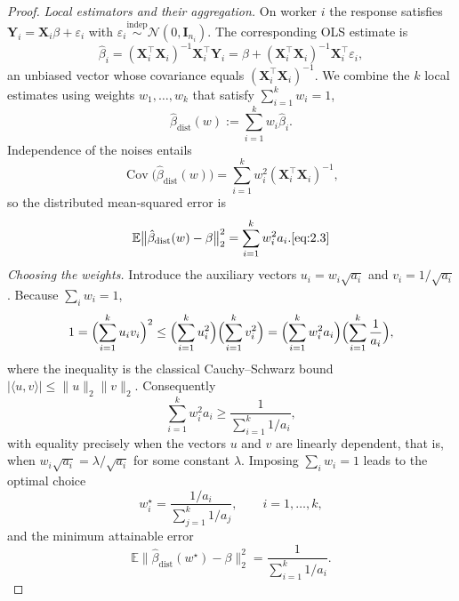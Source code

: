 \documentclass[11pt]{article}
\numberwithin{equation}{section}
\theoremstyle{plain}
\theoremstyle{definition}
\theoremstyle{remark}
\begin{document}
\begin{appendix}
\begin{proof}
      \medskip
      \textit{Local estimators and their aggregation.}
      On worker $i$ the response satisfies
      $\mathbf{Y}_i=\mathbf{X}_i\beta+\varepsilon_i$ with
      $\varepsilon_i\stackrel{\text{indep}}{\sim}\mathcal N(0,\mathbf{I}_{n_i})$.
      The corresponding OLS estimate is
      \[
        \hat\beta_i
         =(\mathbf{X}_i^{\top}\mathbf{X}_i)^{-1}\mathbf{X}_i^{\top}\mathbf{Y}_i
         =\beta+(\mathbf{X}_i^{\top}\mathbf{X}_i)^{-1}\mathbf{X}_i^{\top}\varepsilon_i ,
      \]
      an unbiased vector whose covariance equals $(\mathbf{X}_i^{\top}\mathbf{X}_i)^{-1}$.
      We combine the $k$ local estimates using weights
      $w_1,\dots,w_k$ that satisfy $\sum_{i=1}^{k}w_i=1$,
      \[
        \hat\beta_{\mathrm{dist}}(w)
          :=\sum_{i=1}^{k}w_i\hat\beta_i .
      \]
      Independence of the noises entails
      \[
        \operatorname{Cov}\!\bigl(\hat\beta_{\mathrm{dist}}(w)\bigr)
          =\sum_{i=1}^{k}w_i^{2}(\mathbf{X}_i^{\top}\mathbf{X}_i)^{-1},
      \]
      so the distributed mean-squared error is
      \[
        \mathbb E\bigl\|\hat\beta_{\mathrm{dist}}(w)-\beta\bigr\|_{2}^{2}
          =\sum_{i=1}^{k}w_i^{2}a_i .\ref{eq:2.3}
      \]
      \medskip
      \textit{Choosing the weights.}
      Introduce the auxiliary vectors
      $u_i=w_i\sqrt{a_i}$ and $v_i=1/\sqrt{a_i}$.
      Because $\sum_i w_i=1$,
      \[
        1=\Bigl(\sum_{i=1}^{k}u_iv_i\Bigr)^{2}
          \le
          \Bigl(\sum_{i=1}^{k}u_i^{2}\Bigr)
          \Bigl(\sum_{i=1}^{k}v_i^{2}\Bigr)
          =\Bigl(\sum_{i=1}^{k}w_i^{2}a_i\Bigr)
           \Bigl(\sum_{i=1}^{k}\frac1{a_i}\Bigr),
      \]
      where the inequality is the classical Cauchy–Schwarz bound
      $|\langle u,v\rangle|\le\|u\|_2\|v\|_2$.
      Consequently
      \[
        \sum_{i=1}^{k}w_i^{2}a_i
         \ge\frac{1}{\sum_{i=1}^{k}1/a_i},
      \]
      with equality precisely when the vectors $u$ and $v$
      are linearly dependent, that is, when
      $w_i\sqrt{a_i}=\lambda/\sqrt{a_i}$ for some constant $\lambda$.
      Imposing $\sum_i w_i=1$ leads to the optimal choice
      \[
        w_i^{\star}
          =\frac{\displaystyle 1/a_i}
             {\displaystyle\sum_{j=1}^{k}1/a_j},
          \qquad i=1,\dots,k,
      \]
      and the minimum attainable error
      \[
        \mathbb E\bigl\|\hat\beta_{\mathrm{dist}}(w^{\star})-\beta\bigr\|_{2}^{2}
          =\frac{1}{\displaystyle\sum_{i=1}^{k}1/a_i}.
      \]


\end{proof}
\end{appendix}
\end{document}
